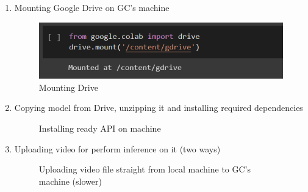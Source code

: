 \begin{enumerate}
    \item Mounting Google Drive on GC's machine
    \newline \begin{figure} [H]
        \centering
        \includegraphics{images/train1}
        \caption{Mounting Drive}
        \label{fig:inference0}
    \end{figure}
    \item Copying model from Drive, unzipping it and installing required dependencies 
    \newline \begin{figure} [H]
        \centering
        \caption{Installing ready API on machine}
        \label{fig:inference1}
    \end{figure}
    \item Uploading video for perform inference on it (two ways)
    \newline \begin{figure} [H]
        \centering
        \caption{Uploading video file straight from local machine to GC's machine (slower)}
        \label{fig:inference2}
    \end{figure}
    \begin{figure} [H]
        \centering

\end{figure}
\end{enumerate}
